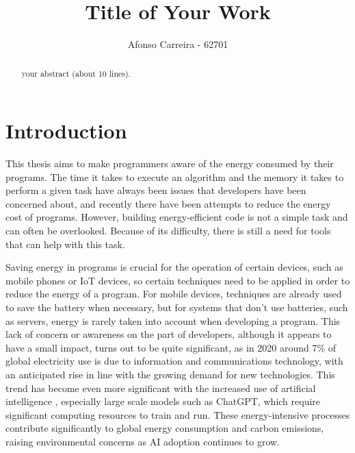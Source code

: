 \documentclass[sigplan]{acmart}
\begin{document}
\title{Title of Your Work}

\author{Afonso Carreira - 62701}


\begin{abstract}
  your abstract (about 10 lines).
\end{abstract}



\pagestyle{plain} %

\maketitle
\section{Introduction}

This thesis aims to make programmers aware of the energy consumed by their programs. The time it takes to execute an algorithm and the memory it takes to perform a given task have always been issues that developers have been concerned about, and recently there have been attempts to reduce the energy cost of programs. However, building energy-efficient code is not a simple task and can often be overlooked. Because of its difficulty, there is still a need for tools that can help with this task\cite{10.1145/2597073.2597110}. 


Saving energy in programs is crucial for the operation of certain devices, such as mobile phones or IoT devices, so certain techniques need to be applied in order to reduce the energy of a program. For mobile devices, techniques are already used to save the battery when necessary, but for systems that don't use batteries, such as servers, energy is rarely taken into account when developing a program.
This lack of concern or awareness on the part of developers, although it appears to have a small impact, turns out to be quite significant, as in 2020 around 7\% of global electricity use is due to information and communications technology, with an anticipated rise in line with the growing demand for new technologies\cite{article}. This trend has become even more significant with the increased use of artificial intelligence \cite{patterson2021carbon}, especially large scale models such as ChatGPT, which require significant computing resources to train and run. These energy-intensive processes contribute significantly to global energy consumption and carbon emissions, raising environmental concerns as AI adoption continues to grow.
\end{document}

